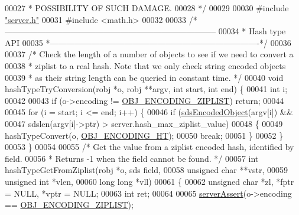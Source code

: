 \begin{DoxyCode}
00027 \textcolor{comment}{ * POSSIBILITY OF SUCH DAMAGE.}
00028 \textcolor{comment}{ */}
00029 
00030 \textcolor{preprocessor}{#}\textcolor{preprocessor}{include} \hyperlink{server_8h}{"server.h"}
00031 \textcolor{preprocessor}{#}\textcolor{preprocessor}{include} \textcolor{preprocessor}{<}\textcolor{preprocessor}{math}\textcolor{preprocessor}{.}\textcolor{preprocessor}{h}\textcolor{preprocessor}{>}
00032 
00033 \textcolor{comment}{/*-----------------------------------------------------------------------------}
00034 \textcolor{comment}{ * Hash type API}
00035 \textcolor{comment}{ *----------------------------------------------------------------------------*/}
00036 
00037 \textcolor{comment}{/* Check the length of a number of objects to see if we need to convert a}
00038 \textcolor{comment}{ * ziplist to a real hash. Note that we only check string encoded objects}
00039 \textcolor{comment}{ * as their string length can be queried in constant time. */}
00040 \textcolor{keywordtype}{void} hashTypeTryConversion(robj *o, robj **argv, \textcolor{keywordtype}{int} start, \textcolor{keywordtype}{int} end) \{
00041     \textcolor{keywordtype}{int} i;
00042 
00043     \textcolor{keywordflow}{if} (o->encoding != \hyperlink{server_8h_aabf064ede983103f1fd0df2086e84eee}{OBJ\_ENCODING\_ZIPLIST}) \textcolor{keywordflow}{return};
00044 
00045     \textcolor{keywordflow}{for} (i = start; i <= end; i++) \{
00046         \textcolor{keywordflow}{if} (\hyperlink{server_8h_afcfb5bd97af52d1dbce331745cae030c}{sdsEncodedObject}(argv[i]) &&
00047             sdslen(argv[i]->ptr) > server.hash\_max\_ziplist\_value)
00048         \{
00049             hashTypeConvert(o, \hyperlink{server_8h_a9c10219f68afc557d510d108257d238b}{OBJ\_ENCODING\_HT});
00050             \textcolor{keywordflow}{break};
00051         \}
00052     \}
00053 \}
00054 
00055 \textcolor{comment}{/* Get the value from a ziplist encoded hash, identified by field.}
00056 \textcolor{comment}{ * Returns -1 when the field cannot be found. */}
00057 \textcolor{keywordtype}{int} hashTypeGetFromZiplist(robj *o, sds field,
00058                            \textcolor{keywordtype}{unsigned} \textcolor{keywordtype}{char} **vstr,
00059                            \textcolor{keywordtype}{unsigned} \textcolor{keywordtype}{int} *vlen,
00060                            \textcolor{keywordtype}{long} \textcolor{keywordtype}{long} *vll)
00061 \{
00062     \textcolor{keywordtype}{unsigned} \textcolor{keywordtype}{char} *zl, *fptr = NULL, *vptr = NULL;
00063     \textcolor{keywordtype}{int} ret;
00064 
00065     \hyperlink{server_8h_a88114b5169b4c382df6b56506285e56a}{serverAssert}(o->encoding == \hyperlink{server_8h_aabf064ede983103f1fd0df2086e84eee}{OBJ\_ENCODING\_ZIPLIST});

\end{DoxyCode}
